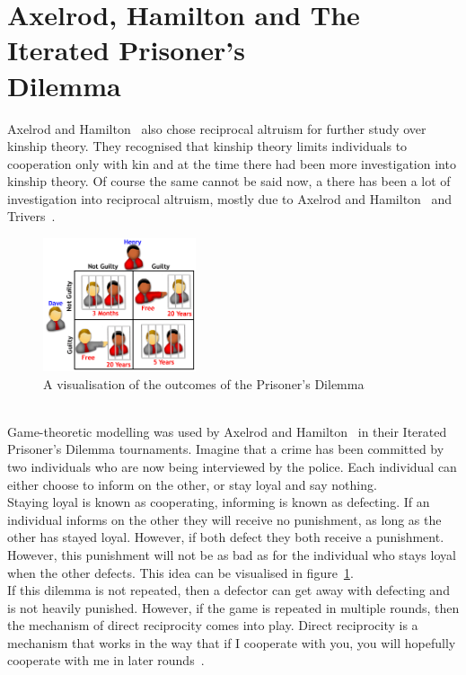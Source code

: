 \documentclass[]{final_report}
\begin{document}
\section{Axelrod, Hamilton and The Iterated Prisoner's\\ Dilemma}
\label{sec:ipd}
Axelrod and Hamilton~\cite{evolution_of_cooperation} also chose reciprocal altruism for further study over kinship theory. They recognised that kinship theory limits individuals to cooperation only with kin and at the time there had been more investigation into kinship theory. Of course the same cannot be said now, a there has been a lot of investigation into reciprocal altruism, mostly due to Axelrod and Hamilton~\cite{evolution_of_cooperation} and Trivers~\cite{trivers1971evolution}.
\begin{figure}
	\center
	\includegraphics[width=0.4\textwidth]{LaymansIPD.png}
	\caption{A visualisation of the outcomes of the Prisoner's Dilemma~\cite{laymansipd}}
	\label{fig:ipdvis}
\end{figure}
\\Game-theoretic modelling was used by Axelrod and Hamilton~\cite{evolution_of_cooperation} in their Iterated Prisoner's Dilemma tournaments. Imagine that a crime has been committed by two individuals who are now being interviewed by the police. Each individual can either choose to inform on the other, or stay loyal and say nothing.\\
Staying loyal is known as cooperating, informing is known as defecting. If an individual informs on the other they will receive no punishment, as long as the other has stayed loyal. However, if both defect they both receive a punishment. However, this punishment will not be as bad as for the individual who stays loyal when the other defects. This idea can be visualised in figure~\ref{fig:ipdvis}.\\
If this dilemma is not repeated, then a defector can get away with defecting and is not heavily punished. However, if the game is repeated in multiple rounds, then the mechanism of direct reciprocity comes into play. Direct reciprocity is a mechanism that works in the way that if I cooperate with you, you will hopefully cooperate with me in later rounds~\cite{five_rules_coop}.\\
\end{document}
